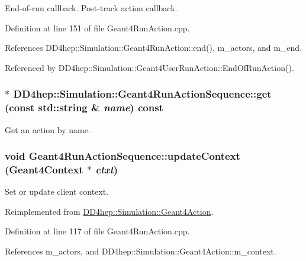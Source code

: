 End-\/of-\/run callback. Post-\/track action callback. 

Definition at line 151 of file Geant4RunAction.cpp.

References DD4hep::Simulation::Geant4RunAction::end(), m\_\-actors, and m\_\-end.

Referenced by DD4hep::Simulation::Geant4UserRunAction::EndOfRunAction().\hypertarget{class_d_d4hep_1_1_simulation_1_1_geant4_run_action_sequence_a8ebffd1974870b7e167f580610c9aa72}{
\subsubsection[{get}]{$\ast$ DD4hep::Simulation::Geant4RunActionSequence::get (const std::string \& {\em name}) const}}
\label{class_d_d4hep_1_1_simulation_1_1_geant4_run_action_sequence_a8ebffd1974870b7e167f580610c9aa72}


Get an action by name. \hypertarget{class_d_d4hep_1_1_simulation_1_1_geant4_run_action_sequence_ad94eee6a819a88302a0eaa0874d88fa3}{
\subsubsection[{updateContext}]{\setlength{\rightskip}{0pt plus 5cm}void Geant4RunActionSequence::updateContext ({\bf Geant4Context} $\ast$ {\em ctxt})}}
\label{class_d_d4hep_1_1_simulation_1_1_geant4_run_action_sequence_ad94eee6a819a88302a0eaa0874d88fa3}


Set or update client context. 

Reimplemented from \hyperlink{class_d_d4hep_1_1_simulation_1_1_geant4_action_ae3b9daf2af881df956c46568c0743313}{DD4hep::Simulation::Geant4Action}.

Definition at line 117 of file Geant4RunAction.cpp.

References m\_\-actors, and DD4hep::Simulation::Geant4Action::m\_\-context.

